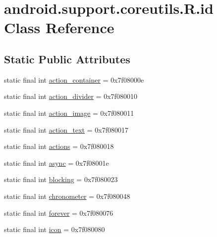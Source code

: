 \hypertarget{classandroid_1_1support_1_1coreutils_1_1_r_1_1id}{}\section{android.\+support.\+coreutils.\+R.\+id Class Reference}
\label{classandroid_1_1support_1_1coreutils_1_1_r_1_1id}
\subsection*{Static Public Attributes}
\begin{DoxyCompactItemize}
\item 
static final int \mbox{\hyperlink{classandroid_1_1support_1_1coreutils_1_1_r_1_1id_acef2a9e85463b5b560ea32ce9cd47e6b}{action\+\_\+container}} = 0x7f08000e
\item 
static final int \mbox{\hyperlink{classandroid_1_1support_1_1coreutils_1_1_r_1_1id_a9c73204912e07e7477a43af96d0e27c1}{action\+\_\+divider}} = 0x7f080010
\item 
static final int \mbox{\hyperlink{classandroid_1_1support_1_1coreutils_1_1_r_1_1id_a6188476618345e0309d8f3e197f8b8de}{action\+\_\+image}} = 0x7f080011
\item 
static final int \mbox{\hyperlink{classandroid_1_1support_1_1coreutils_1_1_r_1_1id_a2cc46f5d3c085d9a2ccd7ce052f355a6}{action\+\_\+text}} = 0x7f080017
\item 
static final int \mbox{\hyperlink{classandroid_1_1support_1_1coreutils_1_1_r_1_1id_aa63244327deb89946fd022a87e166481}{actions}} = 0x7f080018
\item 
static final int \mbox{\hyperlink{classandroid_1_1support_1_1coreutils_1_1_r_1_1id_a4927205f680e6c9b9bc3938c1b916cdc}{async}} = 0x7f08001e
\item 
static final int \mbox{\hyperlink{classandroid_1_1support_1_1coreutils_1_1_r_1_1id_a27c47c4fcebe9cfec13eb2467ad677f3}{blocking}} = 0x7f080023
\item 
static final int \mbox{\hyperlink{classandroid_1_1support_1_1coreutils_1_1_r_1_1id_a43bb36ecac9e8cb1a87d851023111e72}{chronometer}} = 0x7f080048
\item 
static final int \mbox{\hyperlink{classandroid_1_1support_1_1coreutils_1_1_r_1_1id_a83f5015de0c8a0799dc5b817254727e6}{forever}} = 0x7f080076
\item 
static final int \mbox{\hyperlink{classandroid_1_1support_1_1coreutils_1_1_r_1_1id_a9469a9fd3e114f6a1203fceb64114328}{icon}} = 0x7f080080

\end{DoxyCompactItemize}
